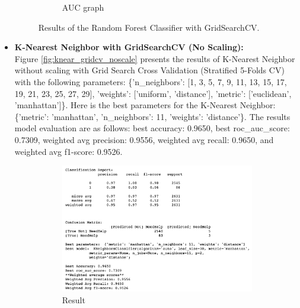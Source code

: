 \documentclass[11pt]{article}
\begin{document}
\begin{itemize}
\begin{figure}[h]
\begin{subfigure}{0.38\textwidth}
         \caption{AUC graph}
         \label{fig:randomforest_gridcv_auc}
\end{subfigure}
\caption{Results of the Random Forest Classifier with GridSearchCV.}
\label{fig:randomforest_gridcv}
\end{figure}

\item \textbf{K-Nearest Neighbor with GridSearchCV (No Scaling):}\\
%
Figure \ref{fig:knear_gridcv_noscale} presents 
the results of K-Nearest Neighbor without scaling with Grid Search Cross Validation (Stratified 5-Folds CV) with the following 
parameters: \{'n\_neighbors': [1, 3, 5, 7, 9, 11, 13, 15, 17, 19, 21, 23, 25, 27, 29], 'weights': ['uniform', 'distance'], 'metric': ['euclidean', 'manhattan']\}.
%
Here is the best parameters for the K-Nearest Neighbor: 
\{'metric': 'manhattan', 'n\_neighbors': 11, 'weights': 'distance'\}.
%
The results model evaluation are as follows:
best accuracy: 0.9650,
best roc\_auc\_score: 0.7309,
weighted avg precision: 0.9556,
weighted avg recall: 0.9650, and
weighted avg f1-score: 0.9526.
%
\begin{figure}[h]
\centering
\begin{subfigure}{0.6\textwidth}
         \centering
         \includegraphics[width=\textwidth]{knear_gridcv_noscaling.png}
         \caption{Result}
         \label{fig:knear_gridcv_noscale_report}
\end{subfigure}
\hfill
\begin{subfigure}{0.38\textwidth}
         \centering

\end{subfigure}
\end{figure}
\end{itemize}
\end{document}
